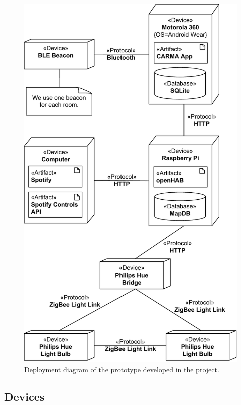 \begin{figure}[!htb]
\centering
\includegraphics[height=\textheight]{images/deployment-diagram}
\caption{Deployment diagram of the prototype developed in the project.}
\label{fig:implementation:deployment-diagram}
\end{figure}

\subsection{Devices}
\label{sec:implementation:status:devices}

